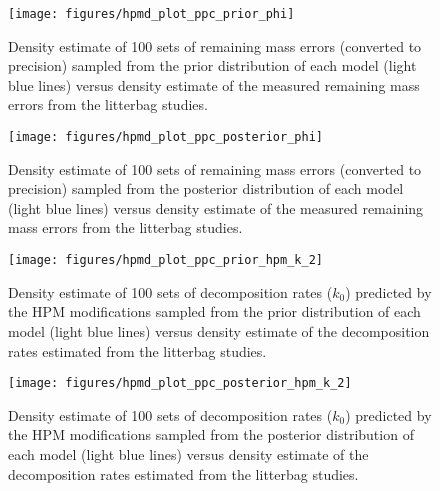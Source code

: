\documentclass[
  12pt,
]{article}
\begin{document}
\begin{figure}[H]

{\centering \texttt{[image: figures/hpmd\_plot\_ppc\_prior\_phi]} 

}

\caption{Density estimate of 100 sets of remaining mass errors (converted to precision) sampled from the prior distribution of each model (light blue lines) versus density estimate of the measured remaining mass errors from the litterbag studies.}\label{fig:sup-hpmd-plot-ppc-prior-phi}
\end{figure}



\begin{figure}[H]

{\centering \texttt{[image: figures/hpmd\_plot\_ppc\_posterior\_phi]} 

}

\caption{Density estimate of 100 sets of remaining mass errors (converted to precision) sampled from the posterior distribution of each model (light blue lines) versus density estimate of the measured remaining mass errors from the litterbag studies.}\label{fig:sup-hpmd-plot-ppc-posterior-phi}
\end{figure}



\begin{figure}[H]

{\centering \texttt{[image: figures/hpmd\_plot\_ppc\_prior\_hpm\_k\_2]} 

}

\caption{Density estimate of 100 sets of decomposition rates (\(k_0\)) predicted by the HPM modifications sampled from the prior distribution of each model (light blue lines) versus density estimate of the decomposition rates estimated from the litterbag studies.}\label{fig:sup-hpmd-plot-ppc-prior-hpm-k-2}
\end{figure}



\begin{figure}[H]

{\centering \texttt{[image: figures/hpmd\_plot\_ppc\_posterior\_hpm\_k\_2]} 

}

\caption{Density estimate of 100 sets of decomposition rates (\(k_0\)) predicted by the HPM modifications sampled from the posterior distribution of each model (light blue lines) versus density estimate of the decomposition rates estimated from the litterbag studies.}\label{fig:sup-hpmd-plot-ppc-posterior-hpm-k-2}
\end{figure}
\end{document}

